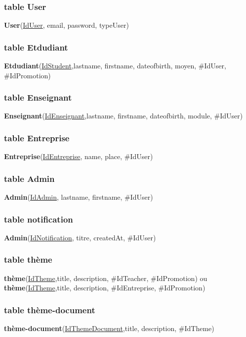 \documentclass[11pt,fleqn]{book} %
\begin{document}
\subsubsection{table User}
\hspace{3em}\textbf{User}(\underline{IdUser}, email, password, typeUser)
\subsubsection{table Etdudiant}
\hspace{3em}\textbf{Etdudiant}(\underline{IdStudent},lastname, firstname, dateofbirth, moyen, \#IdUser, \#IdPromotion)
\subsubsection{table Enseignant}
\hspace{3em}\textbf{Enseignant}(\underline{IdEnseignant},lastname, firstname, dateofbirth, module, \#IdUser)
\subsubsection{table Entreprise}
\hspace{3em}\textbf{Entreprise}(\underline{IdEntreprise}, name, place, \#IdUser)
\subsubsection{table Admin}
\hspace{3em}\textbf{Admin}(\underline{IdAdmin}, lastname, firstname, \#IdUser)

\subsubsection{table notification}
\hspace{3em}\textbf{Admin}(\underline{IdNotification}, titre, createdAt, \#IdUser)

\subsubsection{table thème}
\hspace{3em}\textbf{thème}(\underline{IdTheme},title, description, \#IdTeacher, \#IdPromotion) \hspace{3em}      ou  \hspace{3em}\textbf{thème}(\underline{IdTheme},title, description, \#IdEntreprise, \#IdPromotion)
\subsubsection{table thème-document}
\hspace{3em}\textbf{thème-document}(\underline{IdThemeDocument},title, description, \#IdTheme)
\end{document}
